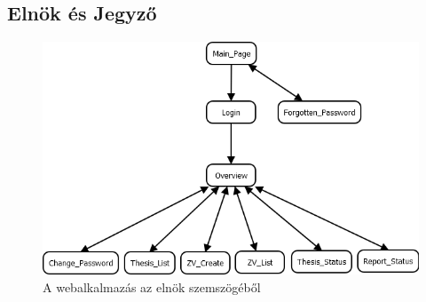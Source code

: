 \subsection{Elnök és Jegyző}

\begin{figure}[h]
\centering
\includegraphics[scale=0.5]{images/Elnok.png}
\caption{A webalkalmazás az elnök szemszögéből}
\label{fig:elnok}
\end{figure}

